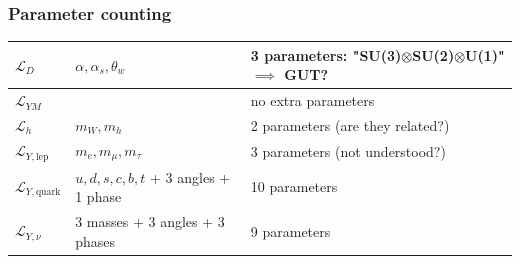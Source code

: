 \subsubsection{Parameter counting}
\begin{table}[h!]
\begin{tabular}{l|l|l}
\centering
$\mathcal{L}_D$ & $\alpha, \alpha_s, \theta_w$ & 3 parameters: "SU(3)$\otimes$SU(2)$\otimes$U(1)" $\implies$ GUT? \\ \hline
$\mathcal{L}_{YM}$  &                                                                       
& no extra parameters\\ \hline
$\mathcal{L}_h$    &                                                                       $m_W, m_h$ & 2 parameters (are they related?)  \\ \hline
$\mathcal{L}_{Y, \text{lep}}$  &                                                                           $m_e, m_\mu, m_\tau$ & 3 parameters (not understood?) \\ \hline
$\mathcal{L}_{Y, \text{quark}}$ &                                                                           $u, d, s, c, b, t$ + 3 angles + 1 phase & 10 parameters  \\ \hline
$\mathcal{L}_{Y, \nu}$ & 3 masses + 3 angles + 3 phases                                                              &  9 parameters                  
\end{tabular}
\end{table}
